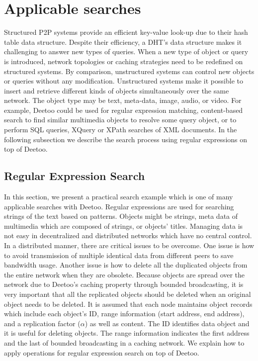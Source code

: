 \documentclass[9.5pt,journal,final,finalsubmission,twocolumn]{IEEEtran}
\begin{document}
\section{Applicable searches}
Structured P2P systems provide an efficient key-value look-up due to 
their hash table data structure.
Despite their efficiency, a DHT's data structure makes it challenging to answer new
types of queries.
When a new type of object or query is introduced, network topologies or 
caching strategies need to be redefined on structured systems. By comparison, 
unstructured systems can control new objects or queries without any modification. 
Unstructured systems make it possible to insert and retrieve 
different kinds of objects simultaneously over the same network.
The object type may be text, meta-data, image, audio, or video.
For example, Deetoo could be used for regular expression
matching, content-based search to find similar multimedia objects to
resolve some query object, or to perform SQL queries, XQuery or XPath searches of XML
documents. In the following subsection we describe the search process using 
regular expressions on top of Deetoo.
 
\subsection{Regular Expression Search}\label{sec:regex}
In this section, we present a practical search example which is one of many 
applicable searches with Deetoo.   
Regular expressions are used for searching strings of the text based on patterns. 
Objects might be strings, meta data of multimedia which are composed of strings, or 
objects' titles.
Managing data is not easy in decentralized and distributed 
networks which have no central control. In a distributed manner, there are critical issues 
to be overcome.
One issue is how to avoid transmission of multiple identical data 
from different peers to save bandwidth usage. 
Another issue is how to delete all the duplicated objects from the entire 
network when they are obsolete. 
Because objects are spread over the network due to Deetoo's caching property through  
bounded broadcasting, it is very important that all the replicated objects  
should be deleted when an original object needs to be deleted. 
It is assumed that each node maintains object records which include each object's ID, 
range information (start address, end address), and a replication factor ($\alpha$) as well as content.
The ID identifies data object and it is useful for deleting objects. 
The range information indicates the first address and the last 
of bounded broadcasting in a caching network. 
We explain how to apply operations for regular expression search on top of Deetoo.
\end{document}
